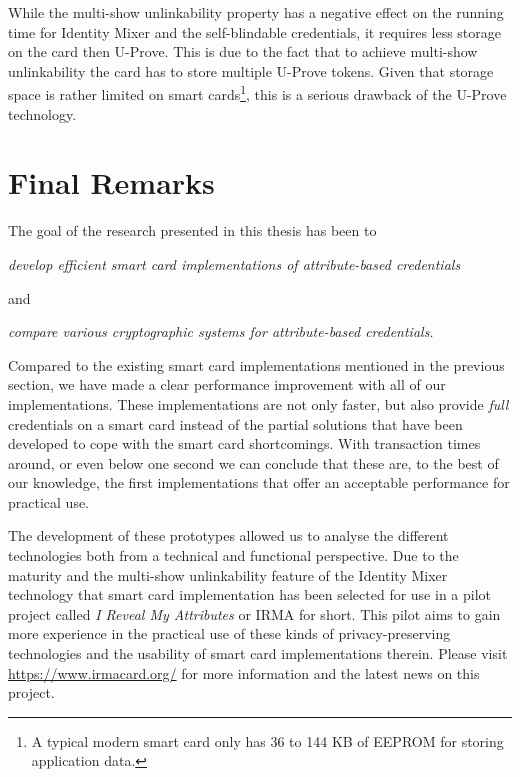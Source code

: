 While the multi-show unlinkability property has a negative effect on the running
time for Identity Mixer and the self-blindable credentials, it requires less
storage on the card then U-Prove. This is due to the fact that to achieve
multi-show unlinkability the card has to store multiple U-Prove tokens. Given
that storage space is rather limited on smart cards\footnote{A typical modern smart
card only has 36 to 144 KB of EEPROM for storing application data.},
this is a serious drawback of the U-Prove technology.

\section{Final Remarks}

The goal of the research presented in this thesis has been to
\begin{center}\it
  develop efficient smart card implementations of attribute-based credentials
\end{center}
and
\begin{center}\it
  compare various cryptographic systems for attribute-based credentials.
\end{center}

Compared to the existing smart card implementations mentioned in the previous 
section, we have made a clear performance improvement with all of our 
implementations. These implementations are not only faster, but also provide 
\emph{full} credentials on a smart card instead of the partial solutions that
have been developed to cope with the smart card shortcomings. With transaction
times around, or even below one second we can conclude that these are, to the 
best of our knowledge, the first implementations that offer an acceptable 
performance for practical use.

The development of these prototypes allowed us to analyse the different
technologies both from a technical and functional perspective. Due to the
maturity and the multi-show unlinkability feature of the Identity Mixer
 technology that smart card implementation has been
selected for use in a pilot project called \emph{I Reveal My Attributes} or
IRMA  for short. This pilot aims to gain more experience in
the practical use of these kinds of privacy-preserving technologies and the
usability of smart card implementations therein. Please visit
\url{https://www.irmacard.org/} for more information and the latest news
on this project.

